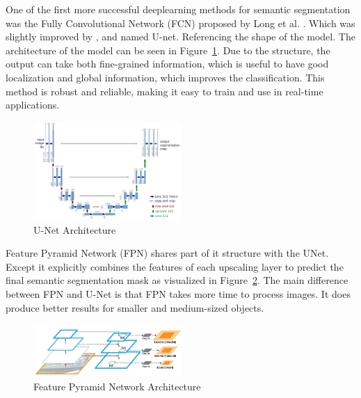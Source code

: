 One of the first more successful deeplearning methods for semantic segmentation was the Fully Convolutional Network (FCN) proposed by Long et al. \cite{long2015fully}. Which was slightly improved by \cite{ronneberger2015u}, and named U-net. Referencing the shape of the model. The architecture of the model can be seen in Figure~\ref{fig:unet-architecture}. Due to the structure, the output can take both fine-grained information, which is useful to have good localization and global information, which improves the classification. This method is robust and reliable, making it easy to train and use in real-time applications.
\begin{figure}[ht]
    \centering
    \includegraphics[width=0.5\textwidth]{figures/unet-architecture.png}
    \caption{U-Net Architecture \cite{ronneberger2015u}}
    \label{fig:unet-architecture}
\end{figure}

Feature Pyramid Network (FPN) \cite{lin2017feature} shares part of it structure with the UNet. Except it explicitly combines the features of each upscaling layer to predict the final semantic segmentation mask as visualized in Figure~\ref{fig:fpn-architecture}. The main difference between FPN and U-Net is that FPN takes more time to process images. It does produce better results for smaller and medium-sized objects.

\begin{figure}[ht]
    \centering
    \includegraphics[width=0.5\textwidth]{figures/fpn-architecture.png}
    \caption{Feature Pyramid Network Architecture \cite{lin2017feature}}
    \label{fig:fpn-architecture}
\end{figure}

